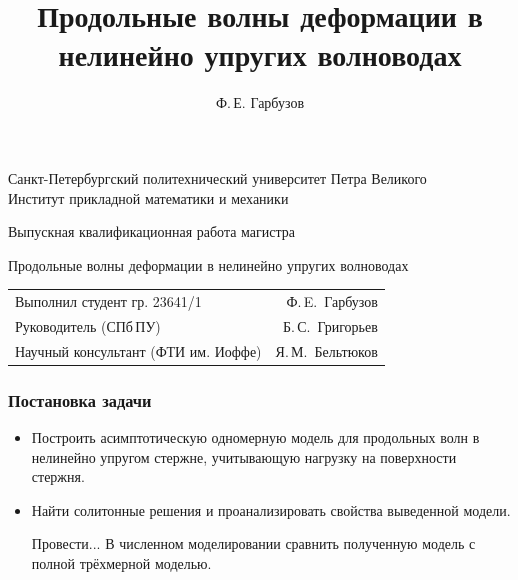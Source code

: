 \documentclass{beamer}
\title[Волны в нелинейно упругих телах]{Продольные волны деформации в нелинейно упругих волноводах}
\author[Ф.\,Е. Гарбузов]{Ф.\,Е. Гарбузов}
\begin{document}

\begin{frame}[plain]
\centering
{\footnotesize
Санкт-Петербургский политехнический университет Петра Великого\\
Институт прикладной математики и механики
}

\vspace{12mm}
Выпускная квалификационная работа магистра
\vspace{3mm}

{\Large\color{blue}
Продольные волны деформации в нелинейно упругих волноводах
}
\vspace{12mm}

{ \footnotesize 
\begin{tabularx}{.9\linewidth}{Xr}
	Выполнил студент гр. 23641/1 & Ф.\,E.~Гарбузов  
	\vspace{2mm}\\
	Руководитель (СПб\,ПУ) & Б.\,С.~Григорьев
	\vspace{2mm}\\
	Научный консультант (ФТИ им. Иоффе)  & Я.\,М.~Бельтюков
\end{tabularx} 
}
\end{frame}
 
\begin{frame}
\frametitle{Постановка задачи}
\begin{itemize}
	\item Построить асимптотическую одномерную модель для продольных волн в нелинейно упругом стержне, учитывающую нагрузку на поверхности стержня.
	\item Найти солитонные решения и проанализировать свойства выведенной модели.
	\item [Провести...] В численном моделировании сравнить полученную модель с полной трёхмерной моделью.
\end{itemize}
\end{frame}
\end{document}
